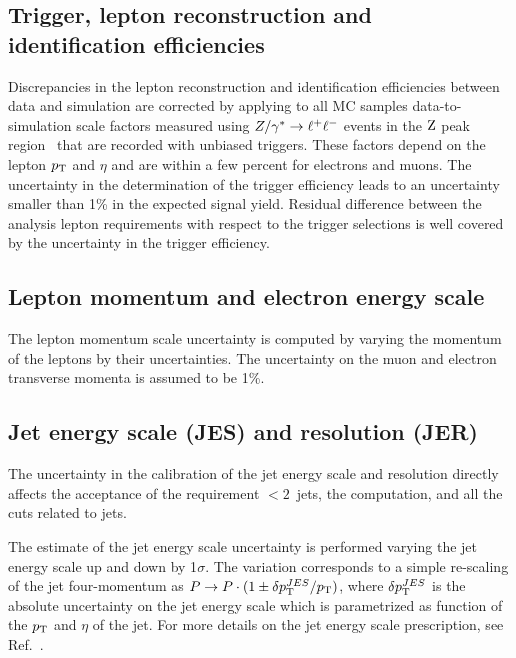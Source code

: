 \subsection{Trigger, lepton reconstruction and identification efficiencies}
Discrepancies in the lepton reconstruction and identification
efficiencies between data and simulation are corrected by applying
to all MC samples data-to-simulation scale factors measured using $Z/\gamma^*\to\ell^+\ell^-$ 
events in the $\mathrm{Z}$ peak region~\cite{wzxs} that are recorded with unbiased triggers. 
These factors depend on the lepton $p_{\mathrm{T}}$ and $\eta$ and are within a few percent for electrons and muons.
The uncertainty in the determination of the trigger efficiency leads to an uncertainty 
smaller than 1\% in the expected signal yield. Residual difference between the analysis 
lepton requirements with respect to the trigger selections is well covered by 
the uncertainty in the trigger efficiency. 

\subsection{Lepton momentum and electron energy scale}

The lepton momentum scale uncertainty is computed by varying the
momentum of the leptons by their uncertainties. 
The uncertainty on the muon and electron transverse momenta is assumed to be 1\%.

\subsection{Jet energy scale (JES) and resolution (JER)}

The uncertainty in the calibration of the jet energy scale and resolution
directly affects the acceptance of the requirement $< 2$~jets, 
the \ETm computation, and all the cuts related to jets. 

The estimate of the jet energy scale uncertainty is performed varying the jet energy scale up and down by 1$\sigma$.
The variation corresponds to a simple re-scaling of the jet four-momentum as
$P\rightarrow P \cdot (1 \pm \delta p_{\mathrm{T}}^{JES}/{p_{\mathrm{T}}})$, where 
$\delta p_{\mathrm{T}}^{JES}$ is the absolute uncertainty on the jet energy scale
which is parametrized as function of the $p_{\mathrm{T}}$ and $\eta$ of the jet. 
For more details on the jet energy scale prescription, see Ref.~\cite{JES2011}. 

